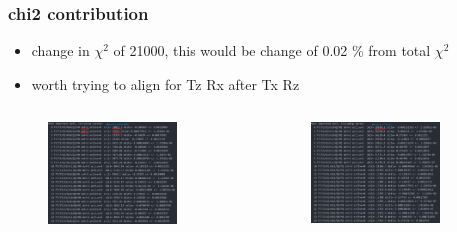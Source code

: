 \documentclass[aspectratio=1610, 12pt]{beamer}
\begin{document}
\begin{frame}
\begin{columns}
\begin{column}[c]{0.5\textwidth}
\begin{figure}
      \end{figure}
    \end{column}
  \end{columns}
\end{frame}

\begin{frame}\frametitle{chi2 contribution}
  \begin{itemize}
    \item change in $\chi^2$ of 21000, this would be change of 0.02 \% from total $\chi^2$
    \item worth trying to align for Tz Rx after Tx Rz
  \end{itemize}
  \begin{columns}
    \begin{column}[c]{0.5\textwidth}
      \begin{figure}
        \includegraphics[width=0.8\textwidth]{plots/10mu_contrib.png}
      \end{figure}
    \end{column}
    \begin{column}[c]{0.5\textwidth}
      \begin{figure}
        \includegraphics[width=0.8\textwidth]{plots/tuned_contrib.png}
      \end{figure}
    \end{column}
  \end{columns}
\end{frame}
\end{document}

